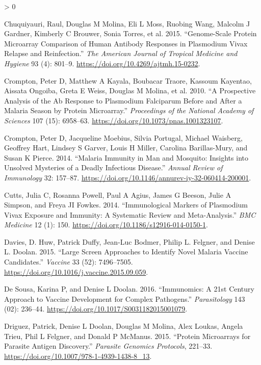 \documentclass[
  a4paper]{article}
\newlength{\cslhangindent}
\newenvironment{CSLReferences}[2] %
 {%
  \setlength{\parindent}{0pt}
  \ifodd #1 \everypar{\setlength{\hangindent}{\cslhangindent}}\ignorespaces\fi
  \ifnum #2 > 0
  \setlength{\parskip}{#2\baselineskip}
  \fi
 }%
 {}
\begin{document}
\begin{CSLReferences}{1}{0}
\leavevmode\hypertarget{ref-chuquiyauri2015vivax}{}%
Chuquiyauri, Raul, Douglas M Molina, Eli L Moss, Ruobing Wang, Malcolm J
Gardner, Kimberly C Brouwer, Sonia Torres, et al. 2015. {``Genome-Scale
Protein Microarray Comparison of Human Antibody Responses in Plasmodium
Vivax Relapse and Reinfection.''} \emph{The American Journal of Tropical
Medicine and Hygiene} 93 (4): 801--9.
\url{https://doi.org/10.4269/ajtmh.15-0232}.

\leavevmode\hypertarget{ref-crompton2010}{}%
Crompton, Peter D, Matthew A Kayala, Boubacar Traore, Kassoum Kayentao,
Aissata Ongoiba, Greta E Weiss, Douglas M Molina, et al. 2010. {``A
Prospective Analysis of the Ab Response to Plasmodium Falciparum Before
and After a Malaria Season by Protein Microarray.''} \emph{Proceedings
of the National Academy of Sciences} 107 (15): 6958--63.
\url{https://doi.org/10.1073/pnas.1001323107}.

\leavevmode\hypertarget{ref-crompton2014rev}{}%
Crompton, Peter D, Jacqueline Moebius, Silvia Portugal, Michael
Waisberg, Geoffrey Hart, Lindsey S Garver, Louis H Miller, Carolina
Barillas-Mury, and Susan K Pierce. 2014. {``Malaria Immunity in Man and
Mosquito: Insights into Unsolved Mysteries of a Deadly Infectious
Disease.''} \emph{Annual Review of Immunology} 32: 157--87.
\url{https://doi.org/10.1146/annurev-iy-32-060414-200001}.

\leavevmode\hypertarget{ref-cutts2014meta}{}%
Cutts, Julia C, Rosanna Powell, Paul A Agius, James G Beeson, Julie A
Simpson, and Freya JI Fowkes. 2014. {``Immunological Markers of
Plasmodium Vivax Exposure and Immunity: A Systematic Review and
Meta-Analysis.''} \emph{BMC Medicine} 12 (1): 150.
\url{https://doi.org/10.1186/s12916-014-0150-1}.

\leavevmode\hypertarget{ref-Davies2015Large}{}%
Davies, D. Huw, Patrick Duffy, Jean-Luc Bodmer, Philip L. Felgner, and
Denise L. Doolan. 2015. {``Large Screen Approaches to Identify Novel
Malaria Vaccine Candidates.''} \emph{Vaccine} 33 (52): 7496--7505.
\url{https://doi.org/10.1016/j.vaccine.2015.09.059}.

\leavevmode\hypertarget{ref-immunomics2016}{}%
De Sousa, Karina P, and Denise L Doolan. 2016. {``Immunomics: A 21st
Century Approach to Vaccine Development for Complex Pathogens.''}
\emph{Parasitology} 143 (02): 236--44.
\url{https://doi.org/10.1017/S0031182015001079}.

\leavevmode\hypertarget{ref-Driguez2015}{}%
Driguez, Patrick, Denise L Doolan, Douglas M Molina, Alex Loukas, Angela
Trieu, Phil L Felgner, and Donald P McManus. 2015. {``Protein
Microarrays for Parasite Antigen Discovery.''} \emph{Parasite Genomics
Protocols}, 221--33. \url{https://doi.org/10.1007/978-1-4939-1438-8_13}.


\end{CSLReferences}
\end{document}
